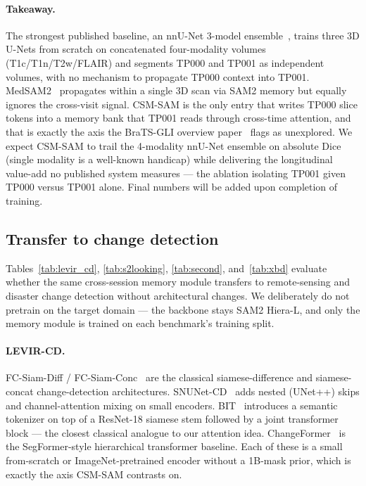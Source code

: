 \paragraph{Takeaway.} The strongest published baseline, an nnU-Net
3-model ensemble~\cite{isensee2021nnunet}, trains three 3D U-Nets from
scratch on concatenated four-modality volumes (T1c/T1n/T2w/FLAIR) and
segments TP000 and TP001 as independent volumes, with no mechanism to
propagate TP000 context into TP001. MedSAM2~\cite{ma2024medsam2}
propagates within a single 3D scan via SAM2 memory but equally ignores
the cross-visit signal. CSM-SAM is the only entry that writes TP000
slice tokens into a memory bank that TP001 reads through cross-time
attention, and that is exactly the axis the BraTS-GLI overview
paper~\cite{delarosa2024brats} flags as unexplored. We expect CSM-SAM
to trail the 4-modality nnU-Net ensemble on absolute Dice (single
modality is a well-known handicap) while delivering the longitudinal
value-add no published system measures --- the ablation isolating
TP001 given TP000 versus TP001 alone. Final numbers will be added upon
completion of training.

\subsection{Transfer to change detection}
\label{sec:results_cd}

Tables~\ref{tab:levir_cd}, \ref{tab:s2looking}, \ref{tab:second},
and~\ref{tab:xbd} evaluate whether the same cross-session memory
module transfers to remote-sensing and disaster change detection
without architectural changes. We deliberately do not pretrain on the
target domain --- the backbone stays SAM2 Hiera-L, and only the memory
module is trained on each benchmark's training split.

\paragraph{LEVIR-CD.} FC-Siam-Diff / FC-Siam-Conc~\cite{daudt2018fcsiam}
are the classical siamese-difference and siamese-concat
change-detection architectures. SNUNet-CD~\cite{fang2022snunet}
adds nested (UNet++) skips and channel-attention mixing on small
encoders. BIT~\cite{chen2021bit} introduces a semantic tokenizer on
top of a ResNet-18 siamese stem followed by a joint transformer
block --- the closest classical analogue to our attention idea.
ChangeFormer~\cite{bandara2022changeformer} is the SegFormer-style
hierarchical transformer baseline. Each of these is a small
from-scratch or ImageNet-pretrained encoder without a 1B-mask prior,
which is exactly the axis CSM-SAM contrasts on.

